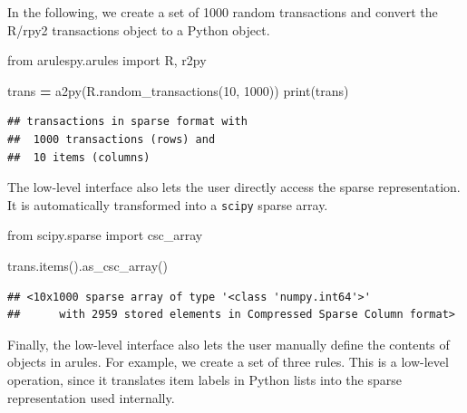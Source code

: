 \documentclass{article}
\newenvironment{Shaded}{\begin{snugshade}}{\end{snugshade}}
\newcommand{\BuiltInTok}[1]{#1}
\newcommand{\DecValTok}[1]{\textcolor[rgb]{0.00,0.00,0.81}{#1}}
\newcommand{\ImportTok}[1]{#1}
\newcommand{\NormalTok}[1]{#1}
\newcommand{\OperatorTok}[1]{\textcolor[rgb]{0.81,0.36,0.00}{\textbf{#1}}}
\begin{document}
In the following, we create a set of 1000 random transactions and
convert the R/rpy2 transactions object to a Python object.

\begin{Shaded}
\begin{Highlighting}[]
\ImportTok{from}\NormalTok{ arulespy.arules }\ImportTok{import}\NormalTok{ R, r2py}

\NormalTok{trans }\OperatorTok{=}\NormalTok{ a2py(R.random\_transactions(}\DecValTok{10}\NormalTok{, }\DecValTok{1000}\NormalTok{))}
\BuiltInTok{print}\NormalTok{(trans)}
\end{Highlighting}
\end{Shaded}

\begin{verbatim}
## transactions in sparse format with
##  1000 transactions (rows) and
##  10 items (columns)
\end{verbatim}

The low-level interface also lets the user directly access the sparse
representation. It is automatically transformed into a \texttt{scipy}
sparse array.

\begin{Shaded}
\begin{Highlighting}[]
\ImportTok{from}\NormalTok{ scipy.sparse }\ImportTok{import}\NormalTok{ csc\_array}

\NormalTok{trans.items().as\_csc\_array()}
\end{Highlighting}
\end{Shaded}

\begin{verbatim}
## <10x1000 sparse array of type '<class 'numpy.int64'>'
##      with 2959 stored elements in Compressed Sparse Column format>
\end{verbatim}

Finally, the low-level interface also lets the user manually define the
contents of objects in arules. For example, we create a set of three
rules. This is a low-level operation, since it translates item labels in
Python lists into the sparse representation used internally.
\end{document}
